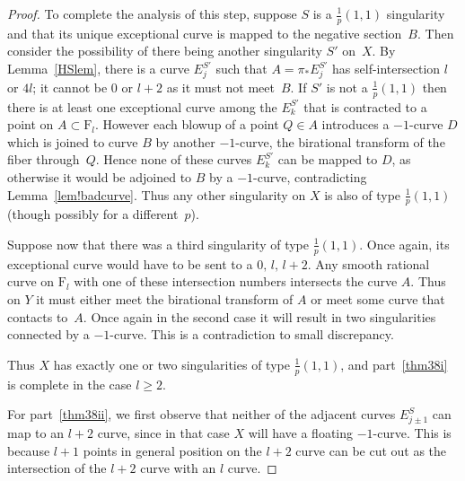\documentclass[12pt,a4paper]{book}      %
\newcommand{\ldp}{log del Pezzo}
\newcommand{\mb}[1]{\mathbb{#1}}
\newcommand{\F}{\mathrm{F}}
\begin{document}
\begin{proof}
To complete the analysis of this step, suppose $S$ is a $\frac{1}{p}(1,1)$ singularity and that its unique exceptional curve is mapped to the negative section~$B$. Then consider the possibility of there being another singularity $S'$ on~$X$. By Lemma~\ref{HSlem}, there is a curve $E_j^{S'}$ such that $A=\pi_* E_j^{S'}$ has self-intersection $l$ or $4l$; it cannot be $0$ or $l+2$ as it must not meet~$B$. If $S'$ is not a $\frac{1}{p}(1,1)$ then there is at least one exceptional curve among the $E_k^{S'}$ that is contracted to a point on $A\subset\F_l$. However each blowup of a point $Q\in A$ introduces a $-1$-curve $D$ which is joined to curve $B$ by another $-1$-curve, the birational transform of the fiber through~$Q$. Hence none of these curves $E_k^{S'}$ can be mapped to $D$, as otherwise it would be adjoined to $B$ by a $-1$-curve, contradicting Lemma~\ref{lem!badcurve}.
Thus any other singularity on $X$ is also of type $\frac{1}{p}(1,1)$ (though possibly for a different~$p$).

Suppose now that there was a third singularity of type $\frac{1}{p}(1,1)$. Once again, its exceptional curve would have to be sent to a $0, \, l, \, l+2$. Any smooth rational curve on $\F_l$ with one of these intersection numbers intersects the curve $A$. Thus on $Y$ it must either meet the birational transform of $A$ or meet some curve that contacts to~$A$. Once again in the second case it will result in two singularities connected by a $-1$-curve. This is a contradiction to small discrepancy.

Thus $X$ has exactly one or two singularities of type $\frac{1}p(1,1)$,
and part~\eqref{thm38i} is complete in the case $l\ge2$.






For part~\eqref{thm38ii}, we first observe that neither of the adjacent curves $E_{j\pm1}^S$ can
map to an $l+2$ curve, since in that case $X$ will have a floating $-1$-curve. This is because $l+1$ points in general position on the $l+2$ curve can be cut out as the intersection of the $l+2$ curve with an $l$ curve.


\end{proof}
\end{document}
